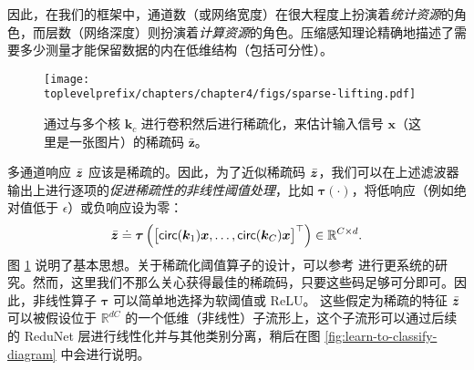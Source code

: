 \documentclass[../../book-main_zh.tex]{subfiles}
\begin{document}
因此，在我们的框架中，通道数（或网络宽度）在很大程度上扮演着{\em 统计资源}的角色，而层数（网络深度）则扮演着{\em 计算资源}的角色。压缩感知理论精确地描述了需要多少测量才能保留数据的内在低维结构（包括可分性）\cite{Wright-Ma-2021}。%

\begin{figure}[t]
	\centerline{
\texttt{[image: \\toplevelprefix/chapters/chapter4/figs/sparse-lifting.pdf]}}
\caption{通过与多个核 $\bm k_c$ 进行卷积然后进行稀疏化，来估计输入信号 $\bm x$（这里是一张图片）的稀疏码 $\bar{\bm z}$。}
		\label{fig:multi-channel-sparse-lifting}
\end{figure}
多通道响应 $\bar {\bm{z}}$ 应该是稀疏的。因此，为了近似稀疏码 $\bar {\bm{z}}$，我们可以在上述滤波器输出上进行逐项的{\em 促进稀疏性的非线性阈值处理}，比如 $\bm \tau(\cdot)$，将低响应（例如绝对值低于 $\epsilon$）或负响应设为零：
\begin{equation}
\bar {\bm{z}} \doteq \bm \tau \left( \big[\mathsf{circ}(\bm k_1) \bm{x}, \ldots, \mathsf{circ}(\bm k_C) \bm{x} \big]^\top \right) \in \mathbb{R}^{C \times d}.
\label{eqn:sparse-lifting}
\end{equation}
图 \ref{fig:multi-channel-sparse-lifting} 说明了基本思想。关于稀疏化阈值算子的设计，可以参考 \cite{Analysis-Filter} 进行更系统的研究。然而，这里我们不那么关心获得最佳的稀疏码，只要这些码足够可分即可。因此，非线性算子 $\bm \tau$ 可以简单地选择为软阈值或 ReLU。
这些假定为稀疏的特征 $\bar {\bm{z}}$ 可以被假设位于 $\mathbb{R}^{dC}$ 的一个低维（非线性）子流形上，这个子流形可以通过后续的 ReduNet 层进行线性化并与其他类别分离，稍后在图 \ref{fig:learn-to-classify-diagram} 中会进行说明。
\end{document}
